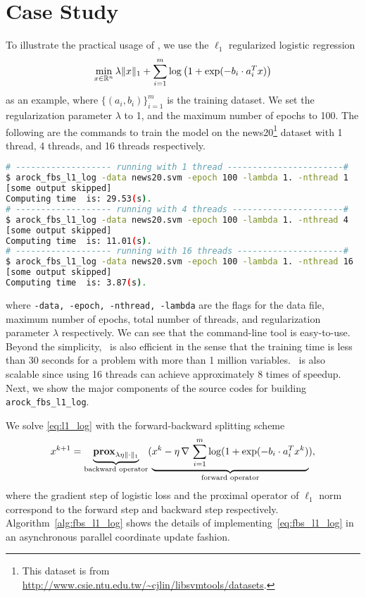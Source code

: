 \section{Case Study}\label{sec:quick_start}
To illustrate the practical usage of \pkg, we use the $\ell_1$ regularized logistic regression
\begin{equation}\label{eq:l1_log}
\min_{x \in \mathbb{R}^n} \lambda \|x\|_1 + \sum_{i = 1}^m \log\left(1 + \exp(-b_i \cdot a_i^T x)\right)
\end{equation}
as an example, where $\{(a_i, b_i)\}_{i = 1}^m$ is the training dataset. We set the regularization parameter
$\lambda$ to 1, and the maximum number of epochs to 100. The following are the commands to train the model
on the news20\footnote{ This dataset is from \url{http://www.csie.ntu.edu.tw/~cjlin/libsvmtools/datasets}.}
dataset with 1 thread, 4 threads, and 16 threads respectively.
\begin{lstlisting}[language=bash]
# ------------------- running with 1 thread -----------------------#
$ arock_fbs_l1_log -data news20.svm -epoch 100 -lambda 1. -nthread 1 
[some output skipped]
Computing time  is: 29.53(s).
# ------------------- running with 4 threads ----------------------#
$ arock_fbs_l1_log -data news20.svm -epoch 100 -lambda 1. -nthread 4 
[some output skipped]
Computing time  is: 11.01(s).
# ------------------- running with 16 threads ---------------------#
$ arock_fbs_l1_log -data news20.svm -epoch 100 -lambda 1. -nthread 16
[some output skipped]
Computing time  is: 3.87(s).
\end{lstlisting}
where \texttt{-data, -epoch, -nthread, -lambda} are the flags for the data file, maximum number of epochs,
total number of threads, and regularization parameter $\lambda$ respectively. We can see that the command-line
tool is easy-to-use. Beyond the simplicity, \pkg~is also efficient in the sense that the training time is
less than 30 seconds for a problem with more than 1 million variables. \pkg~is also scalable since
using 16 threads can achieve approximately 8 times of speedup. Next, we show the major components of the source
codes for building \texttt{arock\_fbs\_l1\_log}.

We solve \eqref{eq:l1_log} with the forward-backward splitting scheme
\begin{equation}\label{eq:fbs_l1_log}
  x^{k+1} = \underbrace{\mathbf{prox}_{\lambda \eta \|\cdot\|_1}}_{\text{backward operator}}
  (\underbrace{x^k - \eta \, \nabla \,\sum_{i = 1}^m \log (1 + \exp(-b_i \cdot a_i^T x^k)}_{\text{forward operator}}),
\end{equation}  
where the gradient step of logistic loss and the proximal operator of $\ell_1$ norm correspond to the
forward step and backward step respectively. Algorithm~\ref{alg:fbs_l1_log} shows the details of
implementing~\eqref{eq:fbs_l1_log} in an asynchronous parallel coordinate update fashion.

